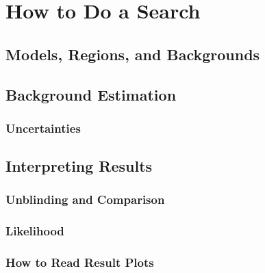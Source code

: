\chapter{How to Do a Search}

\section{Models, Regions, and Backgrounds}\label{sec:background}

\section{Background Estimation}

\subsection*{Uncertainties}

\section{Interpreting Results}

\subsection*{Unblinding and Comparison}

\subsection*{Likelihood}

\subsection*{How to Read Result Plots}
